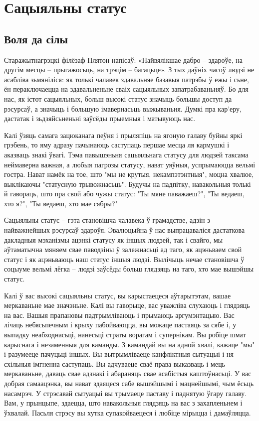 \chapter{Сацыяльны статус}

\section{Воля да сілы}

Старажытнагрэцкі філёзаф Плятон напісаў: «Найвялікшае дабро – здароўе, на другім месцы – прыгажосьць, на трэцім – багацьце». З тых даўніх часоў людзі не асабліва зьмяніліся: як толькі чалавек здавальняе базавыя патрэбы ў ежы і сьне, ён пераключаецца на здавальненьне сваіх сацыяльных запатрабаваньняў. Бо для нас, як істот сацыяльных, больш высокі статус значыць большы доступ да рэсурсаў, а значыць і большую імавернасьць выжываньня. Думкі пра кар'еру, дастатак і зьдзяйсьненьні заўсёды прыемныя і матывуюць нас.

Калі ўзяць самага зацюканага пеўня і прыляпіць на ягоную галаву буйны яркі грэбень, то яму адразу пачынаюць саступаць першае месца ля кармушкі і аказваць знакі ўвагі. Тэма павышэньня сацыяльнага статусу для людзей таксама неймаверна важная, а любыя пагрозы статусу, нават уяўныя, успрымаюцца вельмі гостра. Нават намёк на тое, што "мы не крутыя, некампэтэнтныя", моцна хвалюе, выклікаючы "статусную трывожнасьць". Будучы на падпітку, навакольныя толькі й гавораць, што пра свой або чужы статус: "Ты мяне паважаеш?", "Ты ведаеш, хто я?", "Ты ведаеш, хто мае сябры?"

Сацыяльны статус – гэта становішча чалавека ў грамадстве, адзін з найважнейшых рэсурсаў здароўя. Эвалюцыйна ў нас выпрацаваліся дастаткова дакладныя мэханізмы ацэнкі статусу як іншых людзей, так і свайго, мы аўтаматычна мяняем свае паводзіны ў залежнасьці ад таго, як ацэньваем свой статус і як ацэньваюць наш статус іншыя людзі. Вылічыць нечае становішча ў соцыуме вельмі лёгка – людзі заўсёды больш глядзяць на таго, хто мае вышэйшы статус.

Калі ў вас высокі сацыяльны статус, вы карыстаецеся аўтарытэтам, вашае меркаваньне мае значэньне. Калі вы гаворыце, вас уважліва слухаюць і глядзяць на вас. Вашыя прапановы падтрымліваюць і прымаюць аргумэнтацыю. Вас лічаць небясьпечным і крыху пабойваюцца, вы можаце пастаяць за сябе і, у выпадку неабходнасьці, нанесьці страты ворагам і супернікам. Вы робіце шмат карыснага і незаменныя для каманды. З камандай вы на адной хвалі, кажаце "мы" і разумееце пачуцьці іншых. Вы вытрымліваеце канфліктныя сытуацыі і ня схільныя імгненна саступаць. Вы адчуваеце сваё права выказваць і мець меркаваньне, даваць свае адзнакі і абараняць свае асабістыя каштоўнасьці. У вас добрая самаацэнка, вы нават здаяцеся сабе вышэйшымі і мацнейшымі, чым ёсьць насамрэч. У стрэсавай сытуацыі вы трымаеце паставу і паднятую ўгару галаву. Вам, у прынцыпе, здаецца, што навакольныя глядзяць на вас з захапленьнем і ўхвалай. Пасьля стрэсу вы хутка супакойваецеся і любіце мірыцца і дамаўляцца.


